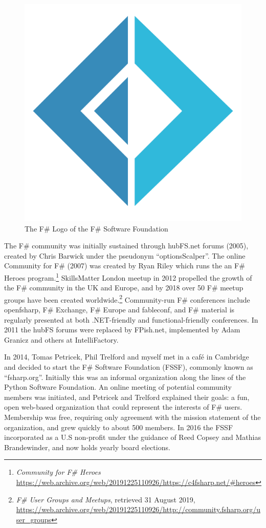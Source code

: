 \documentclass[acmsmall]{acmart}\settopmatter{}
\begin{document}
\begin{figure}
  \begin{center}
  \includegraphics[width=0.9\linewidth]{fsharp-logo.png}
  \end{center}
  \caption{The F\# Logo of the F\# Software Foundation}
  \label{fig:fsharp-logo}
\end{figure}

The F\# community was initially sustained through hubFS.net forums (2005), created by Chris Barwick under the
pseudonym “optionsScalper”. The online Community for F\# (2007) was created by Ryan Riley which runs the
an F\# Heroes program.\footnote{\textit{Community for F\# Heroes} \url{https://web.archive.org/web/20191225110926/https://c4fsharp.net/#heroes}}
SkillsMatter London meetup in 2012 propelled the growth of the F\# community in the UK and Europe, and by 2018
over 50 F\# meetup groups have been created worldwide.\footnote{ \textit{F\# User Groups and Meetups}, retrieved 31 August 2019, \url{https://web.archive.org/web/20191225110926/http://community.fsharp.org/user_groups}}
Community-run F\# conferences include openfsharp, F\# Exchange, F\# Europe and fableconf, and F\# material is regularly presented at both .NET-friendly and functional-friendly conferences. In 2011 the hubFS forums were replaced by FPish.net, implemented by Adam Granicz and others at IntelliFactory. 

In 2014, Tomas Petricek, Phil Trelford and myself met in a café in Cambridge and decided to start the F\# Software
Foundation (FSSF), commonly known as “fsharp.org”.  Initially this was an informal organization along the lines of the Python
Software Foundation.  An online meeting of potential community members was initiated, and Petricek and Trelford explained
their goals: a fun, open web-based organization that could represent the interests of F\# users.  Membership was free,
requiring only agreement with the mission statement of the organization, and grew quickly to about 500 members.  In 2016 the
FSSF incorporated as a U.S non-profit under the guidance of Reed Copsey and Mathias Brandewinder, and now holds yearly board elections. 
\end{document}
